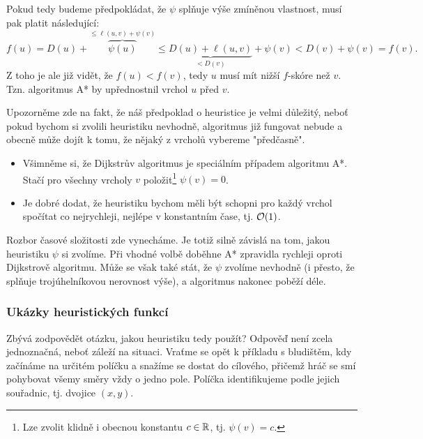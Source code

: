 Pokud tedy budeme předpokládat, že $\psi$ splňuje výše zmíněnou vlastnost, musí pak platit následující:
\[f(u)=D(u)+\overbrace{\psi(u)}^{\leqslant\ell(u,v)+\psi(v)}\leqslant \underbrace{D(u)+\ell(u,v)}_{<D(v)}+\psi(v)<D(v)+\psi(v)=f(v).\]
Z toho je ale již vidět, že $f(u)<f(v)$, tedy $u$ musí mít nižší $f$-skóre než $v$. Tzn. algoritmus A* by upřednostnil vrchol $u$ před $v$.

Upozorněme zde na fakt, že náš předpoklad o heuristice je velmi důležitý, neboť pokud bychom si zvolili heuristiku nevhodně, algoritmus již fungovat nebude a obecně může dojít k tomu, že nějaký z vrcholů vybereme "předčasně".

\begin{remark}
    \begin{itemize}
        \item Všimněme si, že Dijkstrův algoritmus je speciálním případem algoritmu A*. Stačí pro všechny vrcholy $v$ položit\footnote{Lze zvolit klidně i obecnou konstantu $c\in\mathbb{R}$, tj. $\psi(v)=c$.} $\psi(v)=0$.
        \item Je dobré dodat, že heuristiku bychom měli být schopni pro každý vrchol spočítat co nejrychleji, nejlépe v konstantním čase, tj. $\mathcal{O}(1)$.
    \end{itemize}
\end{remark}

Rozbor časové složitosti zde vynecháme. Je totiž silně závislá na tom, jakou heuristiku $\psi$ si zvolíme. Při vhodné volbě doběhne A* zpravidla rychleji oproti Dijkstrově algoritmu. Může se však také stát, že $\psi$ zvolíme nevhodně (i přesto, že splňuje trojúhelníkovou nerovnost výše), a algoritmus nakonec poběží déle.

\subsubsection{Ukázky heuristických funkcí}

Zbývá zodpovědět otázku, jakou heuristiku tedy použít? Odpověď není zcela jednoznačná, neboť záleží na situaci. Vraťme se opět k příkladu s bludištěm, kdy začínáme na určitém políčku a snažíme se dostat do cílového, přičemž hráč se smí pohybovat všemy směry vždy o jedno pole. Políčka identifikujeme podle jejich souřadnic, tj. dvojice $(x,y)$.

